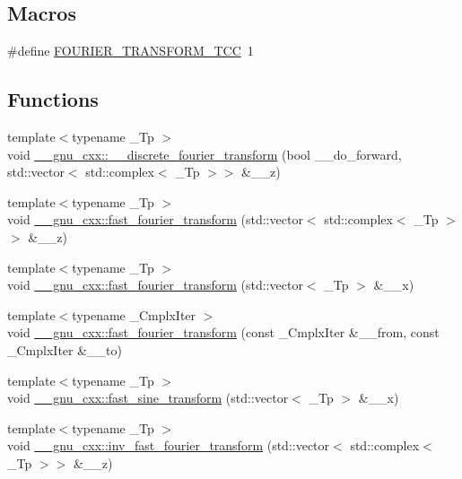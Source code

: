 \subsection*{Macros}
\begin{DoxyCompactItemize}
\item 
\#define \hyperlink{fourier__transform_8tcc_a14631aeeab3dded5b6dcf462996933c3}{F\+O\+U\+R\+I\+E\+R\+\_\+\+T\+R\+A\+N\+S\+F\+O\+R\+M\+\_\+\+T\+CC}~1
\end{DoxyCompactItemize}
\subsection*{Functions}
\begin{DoxyCompactItemize}
\item 
{\footnotesize template$<$typename \+\_\+\+Tp $>$ }\\void \hyperlink{namespace____gnu__cxx_a6dff31b609fa2f8678c729d557dbae49}{\+\_\+\+\_\+gnu\+\_\+cxx\+::\+\_\+\+\_\+discrete\+\_\+fourier\+\_\+transform} (bool \+\_\+\+\_\+do\+\_\+forward, std\+::vector$<$ std\+::complex$<$ \+\_\+\+Tp $>$$>$ \&\+\_\+\+\_\+z)
\item 
{\footnotesize template$<$typename \+\_\+\+Tp $>$ }\\void \hyperlink{namespace____gnu__cxx_a64fbc0765e55d7466a21baa9f652362e}{\+\_\+\+\_\+gnu\+\_\+cxx\+::fast\+\_\+fourier\+\_\+transform} (std\+::vector$<$ std\+::complex$<$ \+\_\+\+Tp $>$$>$ \&\+\_\+\+\_\+z)
\item 
{\footnotesize template$<$typename \+\_\+\+Tp $>$ }\\void \hyperlink{namespace____gnu__cxx_ae6b377214391002ca75ca712823fd45c}{\+\_\+\+\_\+gnu\+\_\+cxx\+::fast\+\_\+fourier\+\_\+transform} (std\+::vector$<$ \+\_\+\+Tp $>$ \&\+\_\+\+\_\+x)
\item 
{\footnotesize template$<$typename \+\_\+\+Cmplx\+Iter $>$ }\\void \hyperlink{namespace____gnu__cxx_a8e1dab366323a810c9915329b520aa5a}{\+\_\+\+\_\+gnu\+\_\+cxx\+::fast\+\_\+fourier\+\_\+transform} (const \+\_\+\+Cmplx\+Iter \&\+\_\+\+\_\+from, const \+\_\+\+Cmplx\+Iter \&\+\_\+\+\_\+to)
\item 
{\footnotesize template$<$typename \+\_\+\+Tp $>$ }\\void \hyperlink{namespace____gnu__cxx_a97f96274ac4998cf6a7c37fcb48c9bff}{\+\_\+\+\_\+gnu\+\_\+cxx\+::fast\+\_\+sine\+\_\+transform} (std\+::vector$<$ \+\_\+\+Tp $>$ \&\+\_\+\+\_\+x)
\item 
{\footnotesize template$<$typename \+\_\+\+Tp $>$ }\\void \hyperlink{namespace____gnu__cxx_a96b56c927599a614656027d3ab4b82ac}{\+\_\+\+\_\+gnu\+\_\+cxx\+::inv\+\_\+fast\+\_\+fourier\+\_\+transform} (std\+::vector$<$ std\+::complex$<$ \+\_\+\+Tp $>$$>$ \&\+\_\+\+\_\+z)
$$
\end{DoxyCompactItemize}
